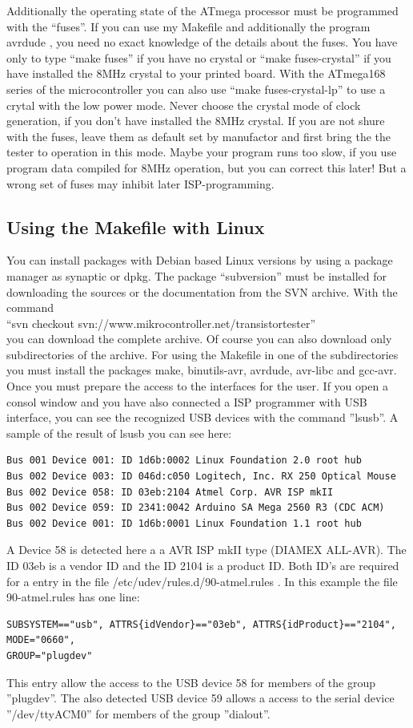 Additionally the operating state of the
ATmega processor must be programmed with the ``fuses''.
If you can use my Makefile and additionally the program avrdude \cite{avrdude}, you need no exact
knowledge of the details about the fuses. You have only to type ``make fuses'' if you
have no crystal or ``make fuses-crystal'' if you have installed the 8MHz crystal to your printed board.
With the ATmega168 series of the microcontroller you can also use ``make fuses-crystal-lp'' to use
a crytal with the low power mode.
Never choose the crystal mode of clock generation, if you don't have installed
the 8MHz crystal. If you are not shure with the fuses, leave them as default
set by manufactor and first bring the the tester to operation in this mode.
Maybe your program runs too slow, if you use program data compiled for
8MHz operation, but you can correct this later! But a wrong set of fuses may inhibit
later ISP-programming.

\subsection{Using the Makefile with Linux}
You can install packages with Debian based Linux versions by using a package manager as synaptic or dpkg.
The package ``subversion'' must be installed for downloading the sources or the documentation from the SVN archive.
With the command \\
``svn checkout svn://www.mikrocontroller.net/transistortester'' \\
you can download the complete archive.
Of course you can also download only subdirectories of the archive.
For using the Makefile in one of the subdirectories you must install the packages
make, binutils-avr, avrdude, avr-libc and gcc-avr.
Once you must prepare the access to the interfaces for the user.
If you open a consol window and you have also connected a ISP programmer with USB interface,
you can see the recognized USB devices with the command ''lsusb''.
A sample of the result of lsusb you can see here:
\begin{verbatim}
Bus 001 Device 001: ID 1d6b:0002 Linux Foundation 2.0 root hub
Bus 002 Device 003: ID 046d:c050 Logitech, Inc. RX 250 Optical Mouse
Bus 002 Device 058: ID 03eb:2104 Atmel Corp. AVR ISP mkII
Bus 002 Device 059: ID 2341:0042 Arduino SA Mega 2560 R3 (CDC ACM)
Bus 002 Device 001: ID 1d6b:0001 Linux Foundation 1.1 root hub
\end{verbatim}
A Device 58 is detected here a a AVR ISP mkII type (DIAMEX ALL-AVR).
The ID 03eb is a vendor ID and the ID 2104 is a product ID.
Both ID's are required for a entry in the file /etc/udev/rules.d/90-atmel.rules .
In this example the file 90-atmel.rules has one line:
\begin{verbatim}
SUBSYSTEM=="usb", ATTRS{idVendor}=="03eb", ATTRS{idProduct}=="2104", MODE="0660",
GROUP="plugdev"
\end{verbatim}
This entry allow the access to the USB device 58 for members of the group ''plugdev''.
The also detected USB device 59 allows a access to the serial device ''/dev/ttyACM0'' for
members of the group ''dialout''.

